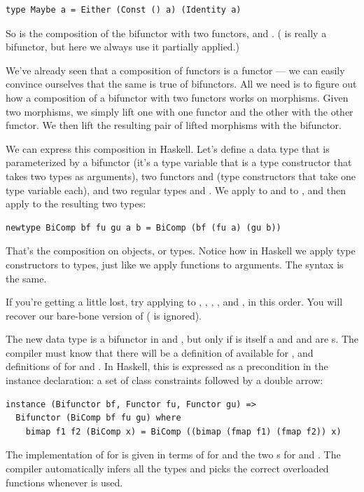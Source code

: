 \begin{verbatim}
type Maybe a = Either (Const () a) (Identity a)
\end{verbatim}
So  is the composition of the bifunctor 
with two functors,  and .
( is really a bifunctor, but here we always use it
partially applied.)

We've already seen that a composition of functors is a functor --- we
can easily convince ourselves that the same is true of bifunctors. All
we need is to figure out how a composition of a bifunctor with two
functors works on morphisms. Given two morphisms, we simply lift one
with one functor and the other with the other functor. We then lift the
resulting pair of lifted morphisms with the bifunctor.

We can express this composition in Haskell. Let's define a data type
that is parameterized by a bifunctor  (it's a type variable
that is a type constructor that takes two types as arguments), two
functors  and  (type constructors that take one
type variable each), and two regular types  and . We
apply  to  and  to , and then
apply  to the resulting two types:

\begin{verbatim}
newtype BiComp bf fu gu a b = BiComp (bf (fu a) (gu b))
\end{verbatim}
That's the composition on objects, or types. Notice how in Haskell we
apply type constructors to types, just like we apply functions to
arguments. The syntax is the same.

If you're getting a little lost, try applying  to
, , , , and
, in this order. You will recover our bare-bone version of
 ( is ignored).

The new data type  is a bifunctor in  and
, but only if  is itself a  and
 and  are s. The compiler must
know that there will be a definition of  available for
, and definitions of  for  and
. In Haskell, this is expressed as a precondition in the
instance declaration: a set of class constraints followed by a double
arrow:

\begin{verbatim}
instance (Bifunctor bf, Functor fu, Functor gu) =>
  Bifunctor (BiComp bf fu gu) where
    bimap f1 f2 (BiComp x) = BiComp ((bimap (fmap f1) (fmap f2)) x) 
\end{verbatim}
The implementation of  for  is given in
terms of  for  and the two s for
 and . The compiler automatically infers all the
types and picks the correct overloaded functions whenever
 is used.

